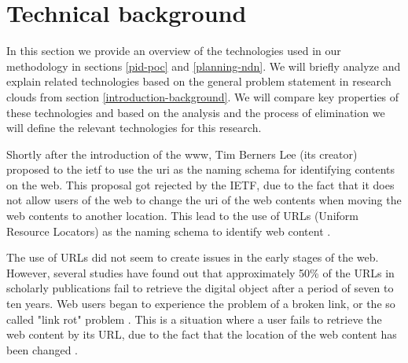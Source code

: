 \section{Technical background}

\label{tech-oview}

In this section we provide an overview of the technologies used in our methodology in sections \ref{pid-poc} and \ref{planning-ndn}. We will briefly analyze and explain related technologies based on the general problem statement in research clouds from section \ref{introduction-background}. We will compare key properties of these technologies and based on the analysis and the process of elimination we will define the relevant technologies for this research.

\label{pid-intr}
Shortly after the introduction of the \gls{www}, Tim Berners Lee (its creator) proposed to the \gls{ietf} to use the \gls{uri} as the naming schema for identifying contents on the web. This proposal got rejected by the IETF, due to the fact that it does not allow users of the web to change the \gls{uri} of the web contents when moving the web contents to another location. This lead to the use of URLs (Uniform Resource Locators) as the naming schema to identify web content \cite{icn-bd}. 
 
The use of URLs did not seem to create issues in the early stages of the web. However, several studies have found out that approximately 50\% of the URLs  in scholarly publications fail to retrieve the digital object after a period of seven to ten years. Web users began to experience the problem of a broken link, or the so called "link rot" problem \cite{rot-link1, rot-link2}. This is a situation where a user fails to retrieve the web content by its URL, due to the fact that the location of the web content has been changed \cite{icn-bd, ark-id}. 

